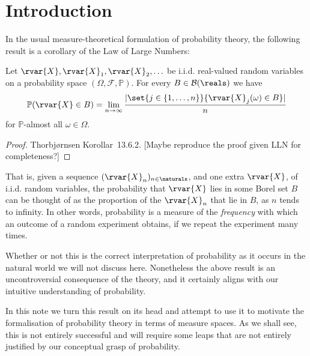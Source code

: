 \documentclass[article, a4paper, 11pt, oneside]{memoir}
\title{\doctitle}
\author{\docauthor}
\numberwithin{equation}{chapter}
\newcommand{\calB}{\mathcal{B}}
\newcommand{\calF}{\mathcal{F}}
\newcommand{\borel}[1]{\calB(#1)}
\renewcommand{\P}{\mathbb{P}}
\DeclarePairedDelimiter{\card}{\lvert}{\rvert}
\begin{document}
\maketitle

\chapter{Introduction}

In the usual measure-theoretical formulation of probability theory, the following result is a corollary of the Law of Large Numbers:

\begin{theorem}
    Let $\rvar{X}, \rvar{X}_1, \rvar{X}_2, \ldots$ be i.i.d. real-valued random variables on a probability space $(\Omega, \calF, \P)$. For every $B \in \borel{\reals}$ we have
    \begin{equation*}
        \P(\rvar{X} \in B)
            = \lim_{n\to\infty} \frac{
                \card{ \set{j \in \{1, \ldots, n\} }{ \rvar{X}_j(\omega) \in B } }
            }{
                n
            }
    \end{equation*}
    for $\P$-almost all $\omega \in \Omega$.
\end{theorem}

\begin{proof}
    Thorbjørnsen Korollar~13.6.2. [Maybe reproduce the proof given LLN for completeness?]
\end{proof}
%
That is, given a sequence $(\rvar{X}_n)_{n\in\naturals}$, and one extra $\rvar{X}$, of i.i.d. random variables, the probability that $\rvar{X}$ lies in some Borel set $B$ can be thought of as the proportion of the $\rvar{X}_n$ that lie in $B$, as $n$ tends to infinity. In other words, probability is a measure of the \emph{frequency} with which an outcome of a random experiment obtains, if we repeat the experiment many times.

Whether or not this is the correct interpretation of probability as it occurs in the natural world we will not discuss here. Nonetheless the above result is an uncontroversial consequence of the theory, and it certainly aligns with our intuitive understanding of probability.

In this note we turn this result on its head and attempt to use it to motivate the formalisation of probability theory in terms of measure spaces. As we shall see, this is not entirely successful and will require some leaps that are not entirely justified by our conceptual grasp of probability.
\end{document}
